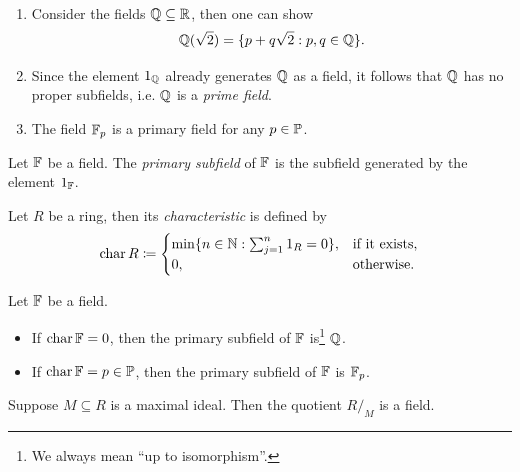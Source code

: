 \begin{example}{\ }
    \begin{enumerate}
        \item Consider the fields $\Q \subseteq \R$, then one can show
        \[
            \Q(\sqrt{2}) = \{ p + q \sqrt{2} : p, q \in \Q \}.
        \]

        \item Since the element $1_\Q$ already generates $\Q$ as a field, it follows that $\Q$ has no proper subfields, i.e. $\Q$ is a \emph{prime field}.
        
        \item The field $\F_p$ is a primary field for any $p \in \P$.
    \end{enumerate}
\end{example}

\begin{definition}
    Let $\F$ be a field. The \emph{primary subfield} of $\F$ is the subfield generated by the element $1_\F$.
\end{definition}

\begin{definition}
    Let $R$ be a ring, then its \emph{characteristic} is defined by
    \[
        \characteristic R \coloneqq \begin{cases}
            \min \{ n \in \N : \sum_{j=1}^n 1_R = 0 \}, & \textrm{if it exists}, \\
            0, & \textrm{otherwise}.
        \end{cases}
    \]
\end{definition}

\begin{lemma}
    Let $\F$ be a field.
    \begin{itemize}
        \item If $\characteristic \F = 0$, then the primary subfield of $\F$ is\footnote{We always mean ``up to isomorphism''.} $\Q$.
        \item If $\characteristic \F = p \in \P$, then the primary subfield of $\F$ is $\F_p$.
    \end{itemize}
\end{lemma}

\begin{lemma}
    Suppose $M \subseteq R$ is a maximal ideal. Then the quotient $R/_M$ is a field.
\end{lemma}

